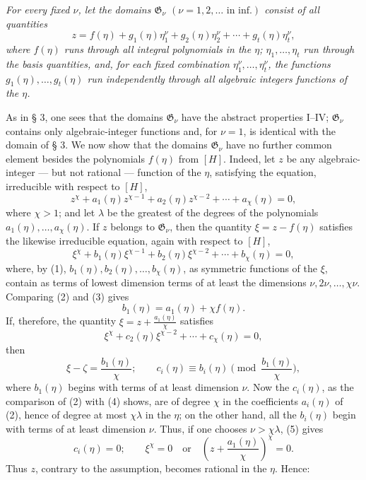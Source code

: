 \documentclass[11pt]{article}
\begin{document}
\emph{For every fixed $\nu$, let the domains $\mathfrak G_\nu$
$(\nu=1,2,\ldots\text{ in inf.})$ consist of all quantities}
\begin{equation}
z=f(\eta)+g_1(\eta)\eta_1^\nu+g_2(\eta)\eta_2^\nu+\cdots+g_t(\eta)\eta_t^\nu,
\tag{1}
\end{equation}
\emph{where $f(\eta)$ runs through all integral polynomials in the $\eta$;
$\eta_1,\ldots,\eta_t$ run through the basis quantities, and, for each fixed
combination $\eta_1^\nu,\ldots,\eta_t^\nu$, the functions
$g_1(\eta),\ldots,g_t(\eta)$ run independently through all algebraic integers
functions of the $\eta$.}

As in § 3, one sees that the domains $\mathfrak G_\nu$ have the abstract
properties I--IV; $\mathfrak G_\nu$ contains only algebraic-integer functions
and, for $\nu=1$, is identical with the domain of § 3. We now show that the
domains $\mathfrak G_\nu$ have no further common element besides the polynomials
$f(\eta)$ from $[H]$. Indeed, let $z$ be any algebraic-integer --- but not
rational --- function of the $\eta$, satisfying the equation, irreducible with
respect to $[H]$,
\begin{equation}
z^\chi+a_1(\eta)z^{\chi-1}+a_2(\eta)z^{\chi-2}+\cdots+a_\chi(\eta)=0,
\tag{2}
\end{equation}
where $\chi>1$; and let $\lambda$ be the greatest of the degrees of the
polynomials $a_1(\eta),\ldots,a_\chi(\eta)$. If $z$ belongs to
$\mathfrak G_\nu$, then the quantity $\xi=z-f(\eta)$ satisfies the likewise
irreducible equation, again with respect to $[H]$,
\begin{equation}
\xi^\chi+b_1(\eta)\xi^{\chi-1}+b_2(\eta)\xi^{\chi-2}+\cdots+b_\chi(\eta)=0,
\tag{3}
\end{equation}
where, by (1), $b_1(\eta),b_2(\eta),\ldots,b_\chi(\eta)$, as symmetric functions
of the $\xi$, contain as terms of lowest dimension terms of at least the
dimensions $\nu,2\nu,\ldots,\chi\nu$. Comparing (2) and (3) gives
\[
 b_1(\eta)=a_1(\eta)+\chi f(\eta).
\]
If, therefore, the quantity $\xi=z+\frac{a_1(\eta)}{\chi}$ satisfies
\begin{equation}
\xi^\chi+c_2(\eta)\xi^{\chi-2}+\cdots+c_\chi(\eta)=0,
\tag{4}
\end{equation}
then
\begin{equation}
 \xi-\zeta=\frac{b_1(\eta)}{\chi};
 \qquad
 c_i(\eta)\equiv b_i(\eta)\pmod{\frac{b_1(\eta)}{\chi}},
\tag{5}
\end{equation}
where $b_1(\eta)$ begins with terms of at least dimension $\nu$. Now the
$c_i(\eta)$, as the comparison of (2) with (4) shows, are of degree $\chi$ in
the coefficients $a_i(\eta)$ of (2), hence of degree at most $\chi\lambda$ in
the $\eta$; on the other hand, all the $b_i(\eta)$ begin with terms of at least
dimension $\nu$. Thus, if one chooses $\nu>\chi\lambda$, (5) gives
\[
 c_i(\eta)=0;\qquad
 \xi^\chi=0\quad\text{or}\quad
 \left(z+\frac{a_1(\eta)}{\chi}\right)^\chi=0.
\]
Thus $z$, contrary to the assumption, becomes rational in the $\eta$. Hence:
\end{document}
